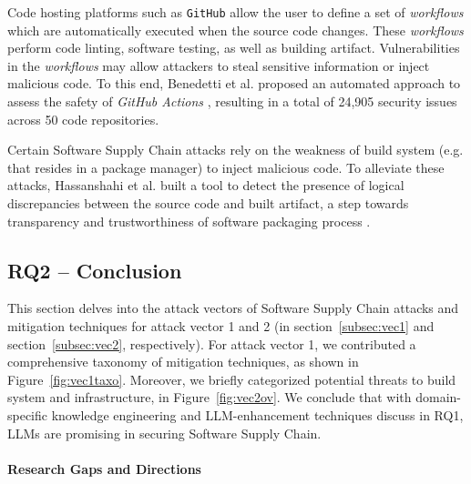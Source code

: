 \par Code hosting platforms such as \texttt{GitHub} allow the user to
define a set of \textit{workflows} which are automatically executed
when the source code changes. These \textit{workflows} perform code linting,
software testing, as well as building artifact. Vulnerabilities
in the \textit{workflows} may allow attackers to steal sensitive 
information or inject malicious code.  To this end, Benedetti
et al. proposed an automated approach to assess the safety of
\textit{GitHub Actions} \citep{10.1145/3560835.3564554}, resulting
in a total of 24,905 security issues across 50 code repositories.

\par Certain Software Supply Chain attacks rely on the weakness of
build system (e.g. that resides in a package manager) to
inject malicious code. To alleviate these attacks, Hassanshahi et al.
built a tool to detect the presence of logical discrepancies between
the source code and built artifact, a step towards transparency and
trustworthiness of software packaging process \citep{10.1145/3605770.3625213}.

\subsection{RQ2 -- Conclusion}\label{subsec:rq2end}

This section delves into the attack vectors of Software Supply Chain attacks
and mitigation techniques for attack vector 1 and 2 (in section~\ref{subsec:vec1}
and section~\ref{subsec:vec2}, respectively).
For attack vector 1, we contributed a comprehensive taxonomy of mitigation
techniques, as shown in Figure~\ref{fig:vec1taxo}. Moreover,
we briefly categorized potential threats to build system and infrastructure,
in Figure~\ref{fig:vec2ov}. We conclude that with domain-specific
knowledge engineering and LLM-enhancement techniques discuss in RQ1,
LLMs are promising in securing Software Supply Chain.

\paragraph*{Research Gaps and Directions}

